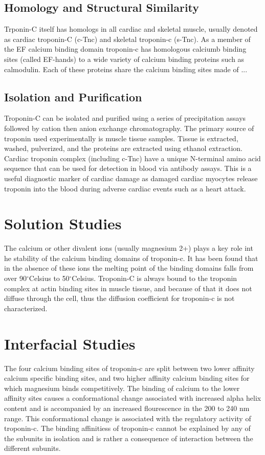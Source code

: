\documentclass[12pt]{article}
\newcommand{\degrees}{{$^{\circ}$}}
\begin{document}
\subsection{Homology and Structural Similarity}
Trponin-C itself has homologs in all cardiac and skeletal muscle, usually denoted as cardiac troponin-C (c-Tnc) and skeletal troponin-c (s-Tnc). As a member of the EF calcium binding domain troponin-c has homologous calciumb binding sites (called EF-hands) to a wide variety of calcium binding proteins such as calmodulin. Each of these proteins share the calcium binding sites made of ...

\subsection{Isolation and Purification}
Troponin-C can be isolated and purified using a series of precipitation assays followed by cation then anion exchange chromatography. The primary source of troponin used experimentally is muscle tissue samples. Tissue is extracted, washed, pulverized, and the proteins are extracted using ethanol extraction. Cardiac troponin complex (including c-Tnc) have a unique N-terminal amino acid sequence that can be used for detection in blood via antibody assays. This is a useful diagnostic marker of cardiac damage as damaged cardiac myocytes release troponin into the blood during adverse cardiac events such as a heart attack.

\section{Solution Studies}
The calcium or other divalent ions (usually magnesium 2+) plays a key role int he stability of the calcium binding domains of troponin-c. It has been found that in the absence of these ions the melting point of the binding domains falls from over 90\degrees Celsius to 50\degrees Celsius. Troponin-C is always bound to the troponin complex at actin binding sites in muscle tissue, and because of that it does not diffuse through the cell, thus the diffusion coefficient for troponin-c is not characterized.

\section{Interfacial Studies}
The four calcium binding sites of troponin-c are split between two lower affinity calcium specific binding sites, and two higher affinity calcium binding sites for which magnesium binds competitively. The binding of calcium to the lower affinity sites causes a conformational change associated with increased alpha helix content and is accompanied by an increased flourescence in the 200 to 240 nm range. This conformational change is associated with the regulatory activity of troponin-c. The binding affinitiess of troponin-c cannot be explained by any of the subunits in isolation and is rather a consequence of interaction between the different subunits.
\end{document}
